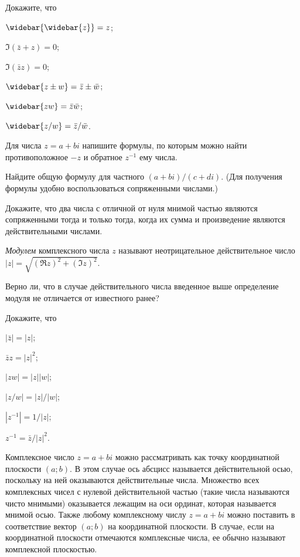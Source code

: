 \documentclass[a4paper, 12pt, num=21]{listok}
\begin{document}
\begin{problem}
	Докажите, что
	\begin{multienum}{3}
		\item \( \widebar{\widebar{z}}  = z\);
		\item \( \Im(\bar z + z) = 0\);
		\item \( \Im(\bar zz) = 0\);
		\item \( \widebar{ z \pm w} = \bar z \pm \bar w\);
		\item \( \widebar{zw} = \bar z \bar w \);
		\item \( \widebar{z/w} = \bar z/ \bar w\).
	\end{multienum}
\end{problem}
\begin{problem}
	Для числа $z = a + bi$ напишите формулы, по которым можно найти противоположное $-z$ и обратное $z^{-1}$ ему числа.
\end{problem}
\begin{problem}
	Найдите общую формулу для частного $(a + bi)/(c + di)$. (Для получения формулы удобно воспользоваться сопряженными числами.)
\end{problem}
\begin{problem}
	Докажите, что два числа с отличной от нуля мнимой частью являются сопряженными
	тогда и только тогда, когда их сумма и произведение являются действительными числами.
\end{problem}
\begin{definition}
	\textit{Модулем} комплексного числа $z$ называют неотрицательное действительное число $|z| = \sqrt{{(\Re z)}^2 + {(\Im z)}^2}$.
\end{definition}
\begin{problem}
	Верно ли, что в случае действительного числа введенное выше определение модуля не отличается от известного ранее?
\end{problem}
\begin{problem}
	Докажите, что
	\begin{multienum}{3}
		\item $|\bar z| = |z|$;
		\item $\bar zz = |z|^2$;
		\item $|zw| = |z||w|$;
		\item $|z/w| = |z|/|w|$;
		\item $|z^{-1}| = 1/|z|$;
		\item $z^{-1} = \bar z/|z|^2$.
	\end{multienum}
\end{problem}
\begin{definition}
	Комплексное число $z = a + bi$ можно рассматривать как точку координатной плоскости $(a; b)$.
	В этом случае ось абсцисс называется действительной осью, поскольку на ней оказываются действительные числа.
	Множество всех комплексных чисел с нулевой действительной частью (такие числа называются чисто мнимыми) оказывается лежащим на оси ординат,
	которая называется мнимой осью.
	Также любому комплексному числу $z = a + bi$ можно поставить в соответствие вектор $(a; b)$ на координатной плоскости.
	В случае, если на координатной плоскости отмечаются комплексные числа, ее обычно называют комплексной плоскостью.
\end{definition}
\end{document}
